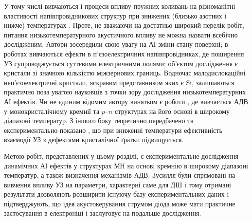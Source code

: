 У тому числі вивчаються і процеси впливу пружних коливань на різноманітні властивості напівпровідникових структур при знижених
(близько азотних і нижче) температурах
\cite{Savkina:FM2003,Savkina:SPQEO2013,Savkina:PJTF2015,Savkina:PSSc2015,Savkina2015,Savkina:JPD2010,kryshtab_savkina_smirnov_2013,
Vlasenko2000r,SavkinaPSSB2002,Zhuravlev,BorkovFTT,sheinkman1995,belyaev1994,buyanova1994,Ostapenko1994,KorotchenAPL1998,KOROTCHENKOV1998,
Korotchenkov1995,KorotchFTP1996,YOlikh:UFG2016,YOlikh:SupMicr,YOlikhTPL2011r}.
Проте, не зважаючи на достатньо широкий перелік робіт, питання низькотемпературного акустичного впливу не можна назвати всебічно дослідженим.
Автори \cite{Savkina:FM2003,Savkina:SPQEO2013,Savkina:PJTF2015,Savkina:PSSc2015,Savkina2015,Savkina:JPD2010,kryshtab_savkina_smirnov_2013}
зосередили свою увагу на АІ зміни стану поверхні;
в роботах \cite{Zhuravlev,BorkovFTT,sheinkman1995,belyaev1994,buyanova1994,Ostapenko1994,KorotchenAPL1998,KOROTCHENKOV1998} вивчаються ефекти в п'єзоелектричних
напівпровідниках, де поширення УЗ супроводжується суттєвими електричними полями;
об'єктом дослідження \cite{Vlasenko2000r,SavkinaPSSB2002,YOlikh:UFG2016,YOlikh:SupMicr} є кристали зі значною кількістю міжзернових границь.
Водночас малодислокаційні неп'єзоелектричні кристали, яскравим представником яких є Si, залишаються практично поза увагою
науковців з точки зору дослідження низькотемпературних АІ ефектів.
Чи не єдиним відомим автору винятком є роботи \cite{Korotchenkov1995,KorotchFTP1996,YOlikhTPL2011r},
де вивчається АДВ у монокристалічному кремнії та $p$--$n$ структурах на його основі в широкому діапазоні температур.
З іншого боку теоретично передбачено \cite{Pavlovich} та експериментально показано \cite{YOlikh:UFG2016,YOlikh:SupMicr},
що при зниженні температури ефективність взаємодії УЗ з дефектами кристалічної ґратки підвищується.

Метою робіт, представлених у цьому розділі, є
експериментальне дослідження динамічних АІ ефектів у структурах МН на основі кремнію в широкому діапазоні температур,
а також визначення механізмів АДВ.
Зусилля були спрямовані на вивчення впливу УЗ на параметри, характерні саме для ДШ і тому отримані результати дозволяють розширити
існуючу базу експериментальних даних і підтверджують, що
ідея акустокерування струмом діода може мати практичне застосування в електроніці і заслуговує на подальше дослідження.

%
%



